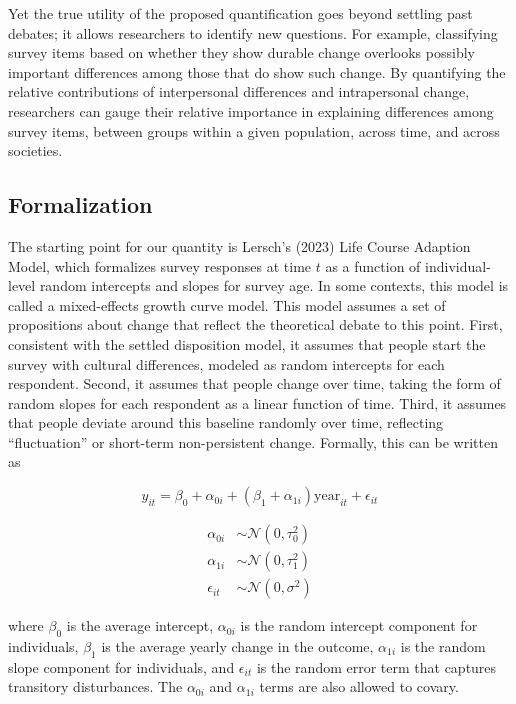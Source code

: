\documentclass[
  12pt,
]{article}
\begin{document}
Yet the true utility of the proposed quantification goes beyond settling
past debates; it allows researchers to identify new questions. For
example, classifying survey items based on whether they show durable
change overlooks possibly important differences among those that do show
such change. By quantifying the relative contributions of interpersonal
differences and intrapersonal change, researchers can gauge their
relative importance in explaining differences among survey items,
between groups within a given population, across time, and across
societies.

\hypertarget{formalization}{%
\subsection{Formalization}\label{formalization}}

The starting point for our quantity is Lersch's (2023) Life Course
Adaption Model, which formalizes survey responses at time \(t\) as a
function of individual-level random intercepts and slopes for survey
age. In some contexts, this model is called a mixed-effects growth curve
model. This model assumes a set of propositions about change that
reflect the theoretical debate to this point. First, consistent with the
settled disposition model, it assumes that people start the survey with
cultural differences, modeled as random intercepts for each respondent.
Second, it assumes that people change over time, taking the form of
random slopes for each respondent as a linear function of time. Third,
it assumes that people deviate around this baseline randomly over time,
reflecting ``fluctuation'' or short-term non-persistent change.
Formally, this can be written as

\[
y_{it} = \beta_0 + \alpha_{0i} + (\beta_1 + \alpha_{1i}) \text{year}_{it} + \epsilon_{it}
\]

\[
\begin{aligned}
\alpha_{0i} &\sim \mathcal{N}(0,\tau^2_{0}) \\
\alpha_{1i} &\sim \mathcal{N}(0,\tau^2_{1}) \\
\epsilon_{it} &\sim \mathcal{N}(0,\sigma^2)
\end{aligned}
\]

where \(\beta_0\) is the average intercept, \(\alpha_{0i}\) is the
random intercept component for individuals, \(\beta_1\) is the average
yearly change in the outcome, \(\alpha_{1i}\) is the random slope
component for individuals, and \(\epsilon_{it}\) is the random error
term that captures transitory disturbances. The \(\alpha_{0i}\) and
\(\alpha_{1i}\) terms are also allowed to covary.
\end{document}
